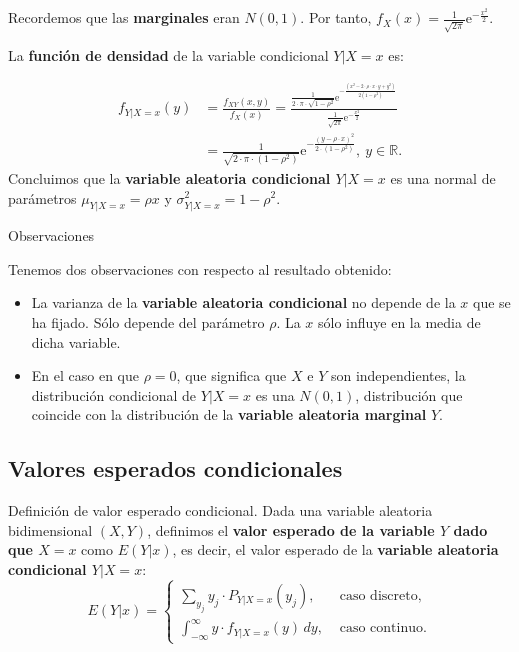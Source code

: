 \documentclass[]{book}
\begin{document}
Recordemos que las \textbf{marginales} eran \(N(0,1)\). Por tanto, \(f_X(x)=\frac{1}{\sqrt{2\pi}}\mathrm{e}^{-\frac{x^2}{2}}.\)

La \textbf{función de densidad} de la variable condicional \(Y|X=x\) es:

\[
\begin{array}{rl}
f_{Y|X=x}(y) & =  \frac{f_{XY}(x,y)}{f_X(x)}=\frac{\frac{1}{2\cdot \pi\cdot \sqrt{1-\rho^2}}\mathrm{e}^{-\frac{(x^2-2\cdot \rho \cdot x\cdot y+y^2)}{2(1-\rho^2)}}}{\frac{1}{\sqrt{2\pi}}\mathrm{e}^{-\frac{x^2}{2}}}\\
& =\frac{1}{\sqrt{2\cdot \pi\cdot  (1-\rho^2)}}\mathrm{e}^{-\frac{(y-\rho\cdot  x)^2}{2\cdot (1-\rho^2)}},\ y\in\mathbb{R}.
\end{array}
\]
Concluimos que la \textbf{variable aleatoria condicional \(Y|X=x\)} es una normal de parámetros \(\mu_{Y|X=x}=\rho x\) y \(\sigma_{Y|X=x}^2 =1-\rho^2\).

Observaciones

Tenemos dos observaciones con respecto al resultado obtenido:

\begin{itemize}
\item
  La varianza de la \textbf{variable aleatoria condicional} no depende de la \(x\) que se ha fijado. Sólo depende del parámetro \(\rho\). La \(x\) sólo influye en la media de dicha variable.
\item
  En el caso en que \(\rho=0\), que significa que \(X\) e \(Y\) son independientes, la distribución condicional de \(Y|X=x\) es una \(N(0,1)\), distribución que coincide con la distribución de la \textbf{variable aleatoria marginal} \(Y\).
\end{itemize}

\hypertarget{valores-esperados-condicionales}{%
\subsection{Valores esperados condicionales}\label{valores-esperados-condicionales}}

Definición de valor esperado condicional.
Dada una variable aleatoria bidimensional \((X,Y)\), definimos el \textbf{valor esperado de la variable \(Y\) dado que \(X=x\)} como \(E(Y|x)\), es decir, el valor esperado de la \textbf{variable aleatoria condicional \(Y|X=x\)}:
\[
E(Y|x)=\begin{cases}
\displaystyle\sum_{y_j} y_j \cdot P_{Y|X=x}(y_j), & \mbox{ caso discreto,}\\
\displaystyle\int_{-\infty}^\infty y \cdot f_{Y|X=x}(y)\,dy, & \mbox{ caso continuo.}
\end{cases}
\]
\end{document}
